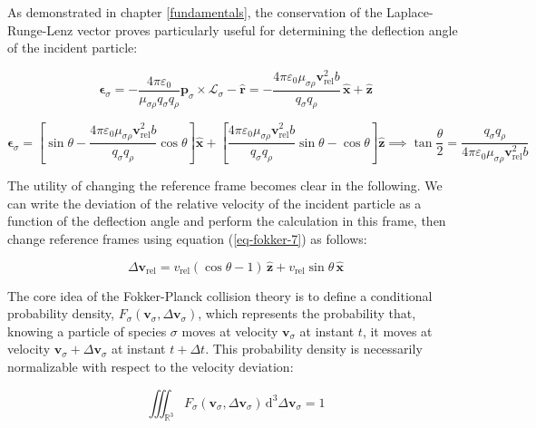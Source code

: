 As demonstrated in chapter \ref{fundamentals}, the conservation of the Laplace-Runge-Lenz vector proves particularly useful for determining the deflection angle of the incident particle:

\begin{equation}
   \boldsymbol{\epsilon}_\sigma=-\frac{4\pi\varepsilon_0}{\mu_{\sigma\rho}q_\sigma q_\rho }\mathbf{p}_\sigma\times\boldsymbol{\mathcal{L}}_\sigma-\mathbf{\hat{r}}=-\frac{4\pi\varepsilon_0\mu_{\sigma\rho}\mathbf{v}_\text{rel}^2b}{q_\sigma q_\rho }\,\mathbf{\hat{x}}+\mathbf{\hat{z}}
\end{equation}

\begin{equation}
    \boldsymbol{\epsilon}_\sigma=\left[\sin{\theta}-\frac{4\pi\varepsilon_0\mu_{\sigma\rho}\mathbf{v}_\text{rel}^2 b}{q_\sigma q_\rho }\cos{\theta}\right]\mathbf{\hat{x}}+\left[\frac{4\pi\varepsilon_0\mu_{\sigma\rho}\mathbf{v}_\text{rel}^2b}{q_\sigma q_\rho }\sin{\theta}-\cos{\theta}\right]\mathbf{\hat{z}}\implies\tan{\frac{\theta}{2}}=\frac{q_\sigma q_\rho }{4\pi\varepsilon_0\mu_{\sigma\rho}\mathbf{v}_\text{rel}^2b}
\end{equation}

The utility of changing the reference frame becomes clear in the following. We can write the deviation of the relative velocity of the incident particle as a function of the deflection angle and perform the calculation in this frame, then change reference frames using equation (\ref{eq-fokker-7}) as follows:

\begin{equation}
    \Delta\mathbf{v}_\text{rel}=v_\text{rel}(\cos{\theta}-1)\,\mathbf{\hat{z}}+v_\text{rel}\sin{\theta}\,\mathbf{\hat{x}}
\end{equation}

The core idea of the Fokker-Planck collision theory is to define a conditional probability density, $F_\sigma(\mathbf{v}_\sigma,\allowbreak\Delta\mathbf{v}_\sigma)$, which represents the probability that, knowing a particle of species $\sigma$ moves at velocity $\mathbf{v}_\sigma$ at instant $t$, it moves at velocity $\mathbf{v}_\sigma+\Delta\mathbf{v}_\sigma$ at instant $t+\Delta t$. This probability density is necessarily normalizable with respect to the velocity deviation:

\begin{equation}
    \iiint_{\mathbb{R}^3} F_\sigma(\mathbf{v}_\sigma,\Delta\mathbf{v}_\sigma)\,\mathrm{d}^3\Delta\mathbf{v}_\sigma=1
\end{equation}

